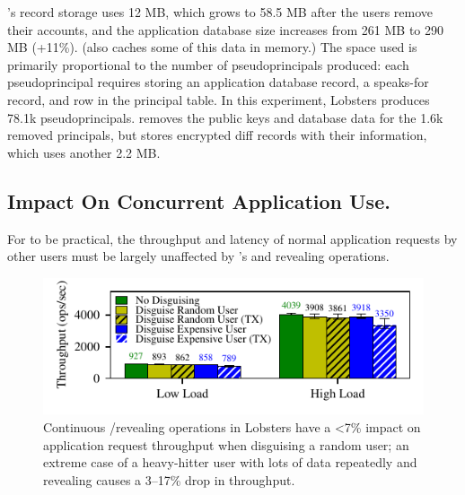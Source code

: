 %
\sys's \xx record storage uses 12 MB, which grows to
58.5 MB after the users remove their accounts, and the application database
size increases from 261 MB to 290 MB (+11\%).
%
(\sys also caches some of this data in memory.)
%
The space used is primarily proportional to the number of pseudoprincipals
produced: each pseudoprincipal requires storing an application database record, a
speaks-for record, and row in the principal table.
%
In this experiment, Lobsters produces 78.1k pseudoprincipals.
%
%
%
%
\sys removes the public keys and database data for the 1.6k removed principals, but
stores encrypted diff records with their information, which uses another 2.2 MB.
%
%

\subsection{Impact On Concurrent Application Use.}
\label{s:eval-conc}


%
%
%
For \sys to be practical, the throughput and latency of normal application requests
by other users must be largely unaffected by \sys's \xxing and revealing operations.
%
%

\begin{figure}[t]
    \centering
    \includegraphics{figs/lobsters_concurrent_results}
    \caption{Continuous \xxing/revealing operations in Lobsters
    have a <7\% impact on application request
    throughput when disguising a random user; an extreme case of a
    heavy-hitter user with lots of data repeatedly \xxing and revealing
    causes a 3--17\% drop in throughput.}
    \label{f:concurrent-lobsters}
\end{figure}

